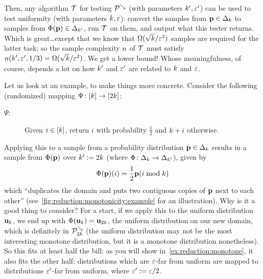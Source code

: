 \noindent Then, any algorithm $\mathcal{T}$ for testing $\mathcal{P}^{\searrow}$ (with parameters $k',\varepsilon'$) can be used to test uniformity (with parameters $k,\varepsilon$): convert the samples from $\mathbf{p}\in\Delta_{k}$ to samples from $\Phi(\mathbf{p})\in\Delta_{k'}$, run $\mathcal{T}$ on them, and output what this tester returns. Which is great\dots except that we know that $\Omega(\sqrt{k}/\varepsilon^2)$ samples are required for the latter task; so the sample complexity $n$ of $\mathcal{T}$ must satisfy $n(k',\varepsilon',1/3) = \Omega(\sqrt{k}/\varepsilon^2)$. We get a lower bound! Whose meaningfulness, of course, depends a lot on how $k'$ and $\varepsilon'$ are related to $k$ and $\varepsilon$.\smallskip

Let us look at an example, to make things more concrete. Consider the following (randomized) mapping $\Psi\colon[k]\to[2k]$: 
\begin{description}
	\item[$\Psi$:] Given $i \in [k]$, return $i$ with probability $\frac{1}{2}$ and $k+i$ otherwise.
\end{description}
Applying this to a sample from a probability distribution $\mathbf{p}\in\Delta_{k}$ results in a sample from $\Phi(\mathbf{p})$ over $k':=2k$ (where $\Phi\colon\Delta_{k}\to\Delta_{k'}$), given by
\begin{equation}
	\label{eq:reduction:monotonicity}
	\Phi(\mathbf{p})(i) = \frac{1}{2}\mathbf{p}(i\bmod k)
\end{equation}
which ``duplicates the domain and puts two contiguous copies of $\mathbf{p}$ next to each other'' (see~\cref{fig:reduction:monotonicity:example} for an illustration). Why is it a good thing to consider? For a start, if we apply this to the uniform distribution $\mathbf{u}_k$, we end up with $\Phi(\mathbf{u}_k) = \mathbf{u}_{2k}$, the uniform distribution on our new domain, which is definitely in $\mathcal{P}^{\searrow}_{2k}$ (the uniform distribution may not be the most interesting monotone distribution, but it is a monotone distribution nonetheless). So this fits at least half the bill: as you will show in~\cref{ex:reduction:monotone}, it also fits the other half: distributions which are $\varepsilon$-far from uniform are mapped to distributions $\varepsilon'$-far from uniform, where $\varepsilon':= \varepsilon/2$.


